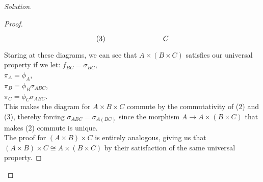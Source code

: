 \documentclass[12pt]{article}
\newenvironment{solution}
  {\renewcommand\qedsymbol{$\blacksquare$}\begin{proof}[Solution]}
{\end{proof}}
\begin{document}
\begin{solution}
\begin{proof}
\[\begin{tikzcd}{(3)}
    &&&C
  \end{tikzcd}\]
  Staring at these diagrams,
  we can see that 
  $A\times (B\times C)$ satisfies our universal property if we let:
  $f_{BC} = \sigma_{BC}$,\\
  $\pi_A = \phi_A$,\\
  $\pi_B = \phi_B\sigma_{ABC}$, \\
  $\pi_C = \phi_C\sigma_{ABC}$.\\
  This makes the diagram for 
  $A\times B\times C$ commute by the commutativity of (2) and (3), 
  thereby forcing $\sigma_{ABC}=\sigma_{A(BC)}$ since the morphism
  $A\to A\times (B\times C)$ that makes (2) commute is unique.\\
  The proof for $(A\times B)\times C$ is entirely analogous, 
  giving us that $(A\times B)\times C \cong A\times (B\times C)$ by their
  satisfaction of the same universal property.
\end{proof}
\end{solution}
\end{document}
